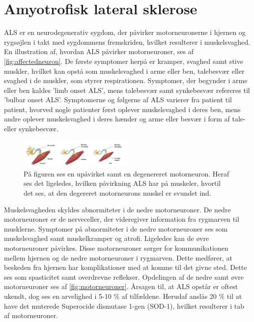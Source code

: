 \section{Amyotrofisk lateral sklerose}
ALS er en neurodegenerativ sygdom, der påvirker motorneuronerne i hjernen og rygsøjlen i takt med sygdommens fremskriden, hvilket resulterer i muskelsvaghed. En illustration af, hvordan ALS påvirker motorneuroner, ses af \autoref{fig:affectedneuron}. De første symptomer herpå er kramper, svaghed samt stive muskler, hvilket kan opstå som muskelsvaghed i arme eller ben, talebesvær eller svaghed i de muskler, som styrer respirationen. Symptomer, der begynder i arme eller ben kaldes 'limb onset ALS', mens talebesvær samt synkebesvær refereres til 'bulbar onset ALS'. 
Symptomerne og følgerne af ALS varierer fra patient til patient, hvorved nogle patienter først oplever muskelsvaghed i deres ben, mens andre oplever muskelsvaghed i deres hænder og arme eller besvær i form af tale- eller synkebesvær. \citep{miller2005} \citep{nationalinstitute2016}

 \begin{figure}[H]
\centering
\includegraphics[width=0.5\textwidth]{figures/affectedneuron}
\caption{På figuren ses en upåvirket samt en degenereret motorneuron. Heraf ses det ligeledes, hvilken påvirkning ALS har på muskeler, hvortil det ses, at den degereret motorneurons muskel er svundet ind. \citep{drake2015}}
\label{fig:affectedneuron}
\end{figure}
 
Muskelsvagheden skyldes abnormiteter i de nedre motorneuroner. De nedre motorneuroner er de nerveceller, der videregiver information fra rygmarven til musklerne. Symptomer på abnormiteter i de nedre motorneuroner ses som muskelsvaghed samt muskelkramper og atrofi.
Ligeledes kan de øvre motorneuroner påvirkes. Disse motorneuroner sørger for kommunikationen mellem hjernen og de nedre motorneuroner i rygmarven. Dette medfører, at beskeden fra hjernen har komplikationer med at komme til det givne sted. Dette ses som spasticitet samt overdrevne reflekser.\citep{nationalinstitute2016} Opdelingen af de nedre samt øvre motorneuroner ses af \autoref{fig:motorneuroner}.
Årsagen til, at ALS opstår er oftest ukendt, dog ses en arvelighed i 5-10 \% af tilfældene. Herudaf anslås 20 \% til at have det muterede Superocide dismutase 1-gen (SOD-1), hvilket resulterer i tab af motorneuroner. \citep{miller2005}

